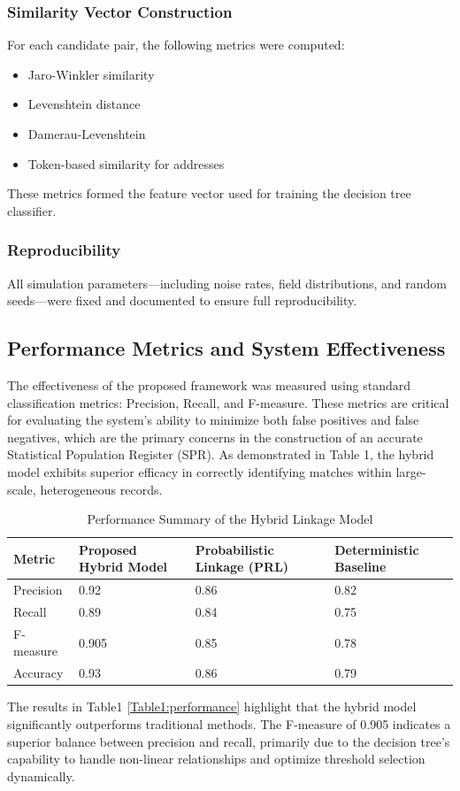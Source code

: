 \documentclass[twoside]{article}
\begin{document}
\subsubsection{Similarity Vector Construction}
For each candidate pair, the following metrics were computed:
\begin{itemize}
	\item 	Jaro-Winkler similarity
	\item	Levenshtein distance
	\item	Damerau-Levenshtein
	\item	Token-based similarity for addresses
\end{itemize}
These metrics formed the feature vector used for training the decision tree classifier.

\subsubsection{Reproducibility}
All simulation parameters—including noise rates, field distributions, and random seeds—were fixed and documented to ensure full reproducibility.

\subsection{Performance Metrics and System Effectiveness}
The effectiveness of the proposed framework was measured using standard classification metrics: Precision, Recall, and F-measure. These metrics are critical for evaluating the system’s ability to minimize both false positives and false negatives, which are the primary concerns in the construction of an accurate Statistical Population Register (SPR).
As demonstrated in Table 1, the hybrid model exhibits superior efficacy in correctly identifying matches within large-scale, heterogeneous records.
\begin{table}[!ht]
	\centering
	\caption{Performance Summary of the Hybrid Linkage Model}
	\label{Table 1:performance}
	\begin{tabular}{|l|l|p{3.5cm}|p{3cm}|}
		\hline
		Metric & Proposed Hybrid Model & Probabilistic Linkage (PRL) & Deterministic Baseline \\ \hline
		Precision & 0.92 & 0.86 & 0.82 \\ \hline
		Recall & 0.89 & 0.84 & 0.75 \\ \hline
		F-measure & 0.905 & 0.85 & 0.78 \\ \hline
		Accuracy & 0.93 & 0.86 & 0.79 \\ \hline
	\end{tabular}
	
	\bigskip 
	\noindent The results in Table1 \ref{Table1:performance} highlight that the hybrid model significantly outperforms traditional methods. The F-measure of 0.905 indicates a superior balance between precision and recall, primarily due to the decision tree's capability to handle non-linear relationships and optimize threshold selection dynamically.
\end{table}
\end{document}

